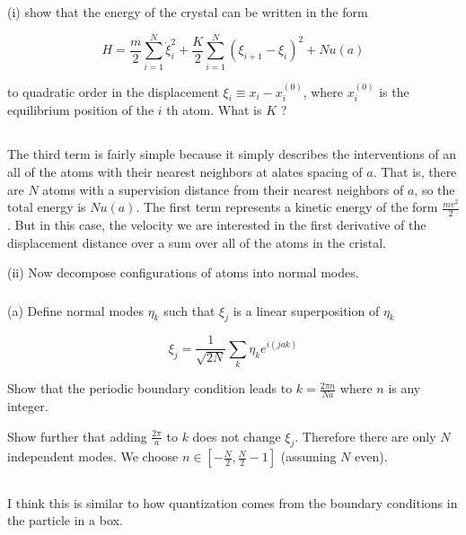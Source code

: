 \documentclass[12pt]{article}
\begin{document}
(i) show that the energy of the crystal can be written in the form


\begin{equation*}
H=\frac{m}{2} \sum_{i=1}^{N} \dot{\xi}_{i}^{2}+\frac{K}{2} \sum_{i=1}^{N}\left(\xi_{i+1}-\xi_{i}\right)^{2}+N u(a) \tag{6}
\end{equation*}


to quadratic order in the displacement $\xi_{i} \equiv x_{i}-x_{i}^{(0)}$, where $x_{i}^{(0)}$ is the equilibrium position of the $i$ th atom. What is $K$ ?
\subsection{}
\subsubsection{}
The third term is fairly simple because it simply describes the interventions of an all of the atoms with their nearest neighbors at alates spacing of $a$. That is, there are $N$ atoms with a supervision distance from their nearest neighbors of $a$, so the total energy is $N u(a)$. The first term represents a kinetic energy of the form $\frac{mv^2}{2}$. But in this case, the velocity we are interested in the first derivative of the displacement distance over a sum over all of the atoms in the cristal. 

(ii) Now decompose configurations of atoms into normal modes.
\subsubsection{}
(a) Define normal modes $\eta_{k}$ such that $\xi_{j}$ is a linear superposition of $\eta_{k}$

\begin{equation*}
\xi_{j}=\frac{1}{\sqrt{2 N}} \sum_{k} \eta_{k} e^{i(j a k)} \tag{7}
\end{equation*}


Show that the periodic boundary condition leads to $k=\frac{2 \pi n}{N a}$ where $n$ is any integer.

Show further that adding $\frac{2 \pi}{a}$ to $k$ does not change $\xi_{j}$. Therefore there are only $N$ independent modes. We choose $n \in\left[-\frac{N}{2}, \frac{N}{2}-1\right]$ (assuming $N$ even).
\subsection{}
I think this is similar to how quantization comes from the boundary conditions in the particle in a box.
\end{document}
